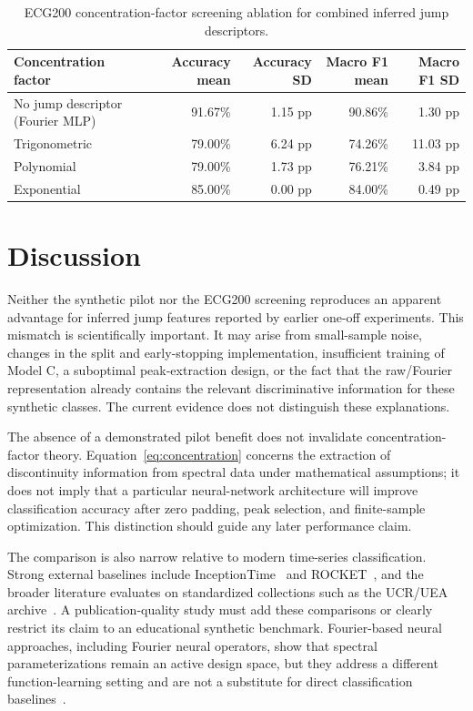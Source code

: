 \documentclass[mathematics,article,submit,moreauthors,pdftex]{mdpi}
\begin{document}
\begin{table}[H]
\caption{ECG200 concentration-factor screening ablation for combined inferred jump descriptors.}
\label{tab:sigmaablation}
\centering
\begin{tabular}{lrrrr}
\toprule
Concentration factor & Accuracy mean & Accuracy SD & Macro F1 mean & Macro F1 SD \\
\midrule
No jump descriptor (Fourier MLP) & 91.67\% & 1.15 pp & 90.86\% & 1.30 pp \\
Trigonometric & 79.00\% & 6.24 pp & 74.26\% & 11.03 pp \\
Polynomial & 79.00\% & 1.73 pp & 76.21\% & 3.84 pp \\
Exponential & 85.00\% & 0.00 pp & 84.00\% & 0.49 pp \\
\bottomrule
\end{tabular}
\end{table}

\section{Discussion}

Neither the synthetic pilot nor the ECG200 screening reproduces an apparent advantage for inferred jump features reported by earlier one-off experiments. This mismatch is scientifically important. It may arise from small-sample noise, changes in the split and early-stopping implementation, insufficient training of Model C, a suboptimal peak-extraction design, or the fact that the raw/Fourier representation already contains the relevant discriminative information for these synthetic classes. The current evidence does not distinguish these explanations.

The absence of a demonstrated pilot benefit does not invalidate concentration-factor theory. Equation~\eqref{eq:concentration} concerns the extraction of discontinuity information from spectral data under mathematical assumptions; it does not imply that a particular neural-network architecture will improve classification accuracy after zero padding, peak selection, and finite-sample optimization. This distinction should guide any later performance claim.

The comparison is also narrow relative to modern time-series classification. Strong external baselines include InceptionTime~\cite{fawaz2020inceptiontime} and ROCKET~\cite{dempster2020rocket}, and the broader literature evaluates on standardized collections such as the UCR/UEA archive~\cite{dau2019ucr,bagnall2017bakeoff,fawaz2019review}. A publication-quality study must add these comparisons or clearly restrict its claim to an educational synthetic benchmark. Fourier-based neural approaches, including Fourier neural operators, show that spectral parameterizations remain an active design space, but they address a different function-learning setting and are not a substitute for direct classification baselines~\cite{li2021fno}.
\end{document}
